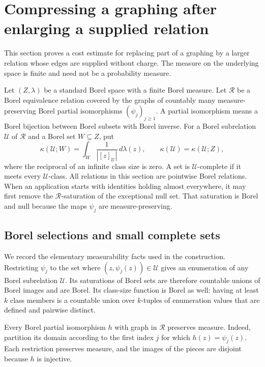 \section{Compressing a graphing after enlarging a supplied relation}
\label{compression:section}

This section proves a cost estimate for replacing part of a graphing by a
larger relation whose edges are supplied without charge.  The measure on
the underlying space is finite and need not be a probability measure.

Let $(Z,\lambda)$ be a standard Borel space with a finite Borel measure.
Let $\mathcal R$ be a Borel equivalence relation covered by the graphs of
countably many measure-preserving Borel partial isomorphisms
$(\psi_j)_{j\geq 1}$.  A partial isomorphism means a Borel bijection between
Borel subsets with Borel inverse.  For a Borel subrelation $\mathcal U$ of
$\mathcal R$ and a Borel set $W\subseteq Z$, put
\[
 \kappa(\mathcal U;W)
 =\int_W\frac{1}{|[z]_{\mathcal U}|}\,d\lambda(z),
 \qquad
 \kappa(\mathcal U)=\kappa(\mathcal U;Z),
\]
where the reciprocal of an infinite class size is zero.  A set is
$\mathcal U$-complete if it meets every $\mathcal U$-class.
All relations in this section are pointwise Borel relations.  When an
application starts with identities holding almost everywhere, it may
first remove the $\mathcal R$-saturation of the exceptional null set.
That saturation is Borel and null because the maps $\psi_j$ are
measure-preserving.

\subsection{Borel selections and small complete sets}

We record the elementary measurability facts used in the construction.
Restricting $\psi_j$ to the set where
$(z,\psi_j(z))\in\mathcal U$ gives an enumeration of any Borel
subrelation $\mathcal U$.  Its saturations of Borel sets are therefore
countable unions of Borel images and are Borel.  Its class-size function
is Borel as well: having at least $k$ class members is a countable union
over $k$-tuples of enumeration values that are defined and pairwise
distinct.

Every Borel partial isomorphism $h$ with graph in $\mathcal R$ preserves
measure.  Indeed, partition its domain according to the first index $j$
for which $h(z)=\psi_j(z)$.  Each restriction preserves measure, and the
images of the pieces are disjoint because $h$ is injective.

